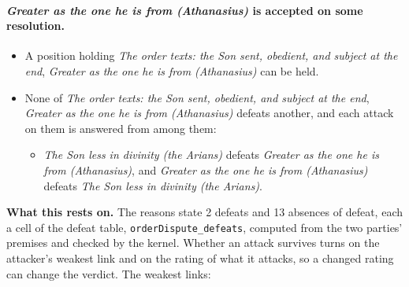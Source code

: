 \documentclass[11pt,paper=\testimonypaper,DIV=13,parskip=false]{scrartcl}
\begin{document}
\paragraph{\emph{Greater as the one he is from (Athanasius)} is accepted on some resolution.}
\begin{itemize}
\item A position holding \emph{The order texts: the Son sent, obedient, and subject at the end}, \emph{Greater as the one he is from (Athanasius)} can be held.
\item None of \emph{The order texts: the Son sent, obedient, and subject at the end}, \emph{Greater as the one he is from (Athanasius)} defeats another, and each attack on them is answered from among them:
\begin{itemize}
\item \emph{The Son less in divinity (the Arians)} defeats \emph{Greater as the one he is from (Athanasius)}, and \emph{Greater as the one he is from (Athanasius)} defeats \emph{The Son less in divinity (the Arians)}.
\end{itemize}
\end{itemize}
\par\noindent\textbf{What this rests on.} The reasons state 2 defeats and 13 absences of defeat, each a cell of the defeat table, \texttt{order\allowbreak{}Dispute\_\allowbreak{}defeats}, computed from the two parties' premises and checked by the kernel. Whether an attack survives turns on the attacker's weakest link and on the rating of what it attacks, so a changed rating can change the verdict. The weakest links:
\end{document}
